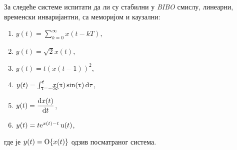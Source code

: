 \PID
За следеће системе испитати да ли су стабилни
у \textit{BIBO} смислу,
линеарни, временски инваријантни, 
са меморијом и каузални: 
\begin{multicols}{3}
\begin{enumerate}[label=(\alph*)]
\item $y(t) = \sum_{k = 0}^{\infty} x(t-kT)$, 
\item $y(t) = \sqrt{2} x(t)$,
\item $y(t) = t \left( x(t-1) \right)^2$,
\item $y(t) = \int_{\uptau = -\infty}^{t}
\hspace{-0.99em}
x(\uptau) \sin(\uptau) \,{\rm d}\tau$,
\item $y(t) = \dfrac{{\rm d} x(t)}{{\rm d} t}
$,
\item $y(t) =t {\rm e}^{x(t) - t} \, {\rm u}(t)$,
\end{enumerate}
\end{multicols}\noindent
где је $y(t) = {\rm O}\{x(t)\}$ одзив посматраног система.
\\[2mm]


